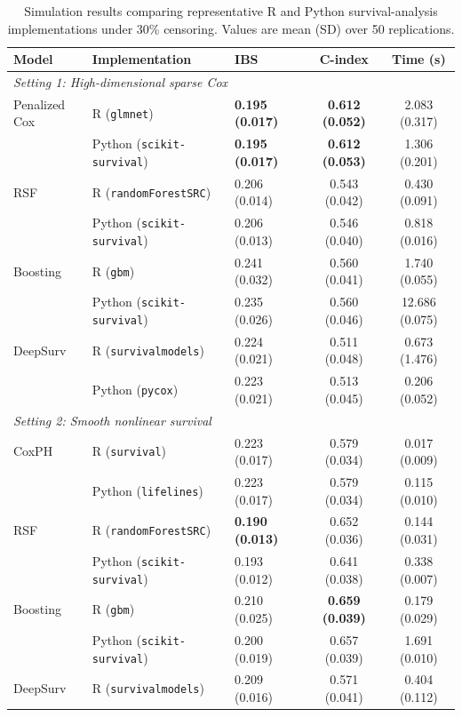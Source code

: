 \begin{table}[htbp]
\centering
\small
\caption{Simulation results comparing representative R and Python survival-analysis implementations under 30\% censoring. Values are mean (SD) over 50 replications.}
\label{tab:survival_simulation_results}
\setlength{\tabcolsep}{4pt}
\renewcommand{\arraystretch}{1.12}
\begin{tabular}{lllcc}
\hline
Model & Implementation & IBS & C-index & Time (s) \\
\hline
\multicolumn{5}{l}{\textit{Setting 1: High-dimensional sparse Cox}}\\
Penalized Cox & R (\texttt{glmnet}) & \textbf{0.195 (0.017)} & \textbf{0.612 (0.052)} & 2.083 (0.317) \\
 & Python (\texttt{scikit-survival}) & \textbf{0.195 (0.017)} & \textbf{0.612 (0.053)} & 1.306 (0.201) \\
RSF & R (\texttt{randomForestSRC}) & 0.206 (0.014) & 0.543 (0.042) & 0.430 (0.091) \\
 & Python (\texttt{scikit-survival}) & 0.206 (0.013) & 0.546 (0.040) & 0.818 (0.016) \\
Boosting & R (\texttt{gbm}) & 0.241 (0.032) & 0.560 (0.041) & 1.740 (0.055) \\
 & Python (\texttt{scikit-survival}) & 0.235 (0.026) & 0.560 (0.046) & 12.686 (0.075) \\
DeepSurv & R (\texttt{survivalmodels}) & 0.224 (0.021) & 0.511 (0.048) & 0.673 (1.476) \\
 & Python (\texttt{pycox}) & 0.223 (0.021) & 0.513 (0.045) & 0.206 (0.052) \\
\hline
\multicolumn{5}{l}{\textit{Setting 2: Smooth nonlinear survival}}\\
CoxPH & R (\texttt{survival}) & 0.223 (0.017) & 0.579 (0.034) & 0.017 (0.009) \\
 & Python (\texttt{lifelines}) & 0.223 (0.017) & 0.579 (0.034) & 0.115 (0.010) \\
RSF & R (\texttt{randomForestSRC}) & \textbf{0.190 (0.013)} & 0.652 (0.036) & 0.144 (0.031) \\
 & Python (\texttt{scikit-survival}) & 0.193 (0.012) & 0.641 (0.038) & 0.338 (0.007) \\
Boosting & R (\texttt{gbm}) & 0.210 (0.025) & \textbf{0.659 (0.039)} & 0.179 (0.029) \\
 & Python (\texttt{scikit-survival}) & 0.200 (0.019) & 0.657 (0.039) & 1.691 (0.010) \\
DeepSurv & R (\texttt{survivalmodels}) & 0.209 (0.016) & 0.571 (0.041) & 0.404 (0.112) \\

\end{tabular}
\end{table}
